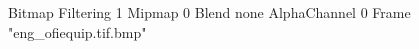 {Bitmap
	{Filtering 1}
	{Mipmap 0}
	{Blend none}
	{AlphaChannel 0}
	{Frame "eng_ofiequip.tif.bmp"}
}
